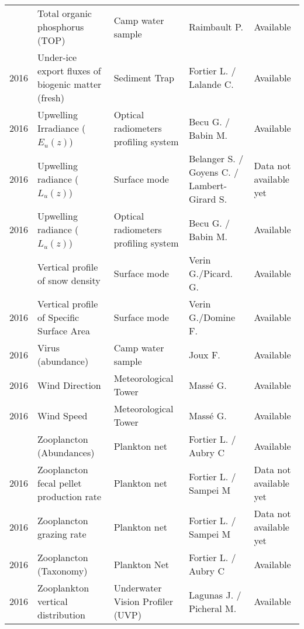 \documentclass[]{article}
\begin{document}
\begin{landscape}
\begin{longtable}[t]{rllll}
\addlinespace
2016 & Total organic phosphorus (TOP) & Camp water sample & Raimbault P. & Available\\
2016 & Under-ice export fluxes of biogenic matter (fresh) & Sediment Trap & Fortier L. / Lalande C. & Available\\
2016 & Upwelling Irradiance ($E_u(z)$) & Optical radiometers profiling system & Becu G. / Babin M. & Available\\
2016 & Upwelling radiance ($L_u(z)$) & Surface mode & Belanger S. / Goyens C. / Lambert-Girard S. & Data not available yet\\
2016 & Upwelling radiance ($L_u(z)$) & Optical radiometers profiling system & Becu G. / Babin M. & Available\\
\addlinespace
2016 & Vertical profile of snow density & Surface mode & Verin G./Picard. G. & Available\\
2016 & Vertical profile of Specific Surface Area & Surface mode & Verin G./Domine F. & Available\\
2016 & Virus (abundance) & Camp water sample & Joux F. & Available\\
2016 & Wind Direction & Meteorological Tower & Massé G. & Available\\
2016 & Wind Speed & Meteorological Tower & Massé G. & Available\\
\addlinespace
2016 & Zooplancton (Abundances) & Plankton net & Fortier L. / Aubry C & Available\\
2016 & Zooplancton fecal pellet production rate & Plankton net & Fortier L. / Sampei M & Data not available yet\\
2016 & Zooplancton grazing rate & Plankton net & Fortier L. / Sampei M & Data not available yet\\
2016 & Zooplancton (Taxonomy) & Plankton Net & Fortier L. / Aubry C & Available\\
2016 & Zooplankton vertical distribution & Underwater Vision Profiler (UVP) & Lagunas J. / Picheral M. & Available\\*
\end{longtable}
\endgroup{}
\end{landscape}
\end{document}
